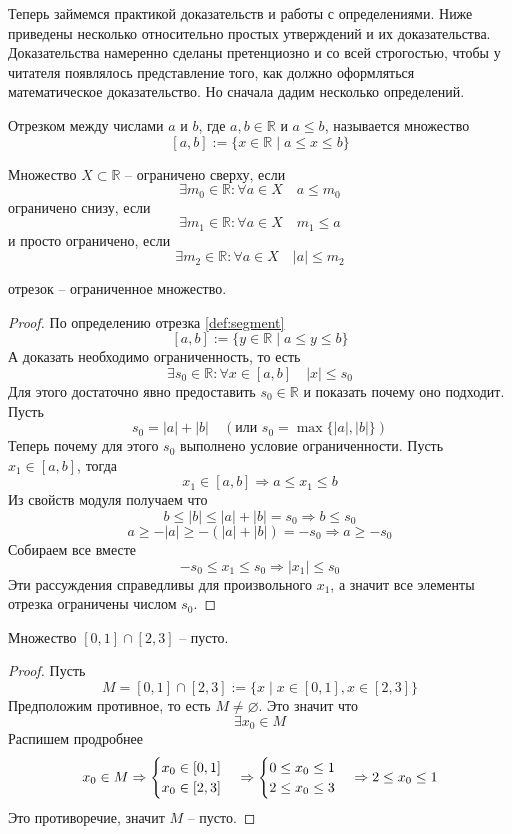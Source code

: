 Теперь займемся практикой доказательств и работы с определениями. Ниже приведены несколько относительно простых утверждений и их доказательства. Доказательства намеренно сделаны претенциозно и со всей строгостью, чтобы у читателя появлялось представление того, как должно оформляться математическое доказательство. Но сначала дадим несколько определений.
\begin{definition}\label{def:segment}
Отрезком между числами $a$ и $b$, где $a,b\in \mathbb{R}$ и $a\leq b$, называется множество
\[[a,b] := \{x\in \mathbb{R}\mid a\leq x\leq b\}\]
\end{definition}
\begin{definition}
Множество $X\subset\mathbb{R}$ -- ограничено сверху, если
\[\exists m_0\in\mathbb{R}:\forall a\in X\quad a\leq m_0\]
ограничено снизу, если
\[\exists m_1\in\mathbb{R}:\forall a\in X\quad m_1\leq a\]
и просто ограничено, если 
\[\exists m_2\in\mathbb{R}:\forall a\in X\quad |a|\leq m_2\]
\end{definition}
\begin{statement}
отрезок -- ограниченное множество.
\end{statement}
\begin{proof}
По определению отрезка \ref{def:segment}
\[[a,b] := \{y\in \mathbb{R}\mid a\leq y\leq b\}\]
А доказать необходимо ограниченность, то есть
\[\exists s_0\in\mathbb{R}:\forall x\in [a,b]\quad |x|\leq s_0\]
Для этого достаточно явно предоставить $s_0\in\mathbb{R}$ и показать почему оно подходит.\\
Пусть \[s_0 =|a|+|b|\quad(\text{или }s_0 = \max\{|a|,|b|\})\]
Теперь почему для этого $s_0$ выполнено условие ограниченности. Пусть $x_1\in[a,b]$, тогда
\[x_1\in [a,b]\Rightarrow a\leq x_1\leq b\]
Из свойств модуля получаем что
\[b\leq|b|\leq|a|+|b|=s_0\Rightarrow b\leq s_0\]
\[a\geq-|a|\geq-(|a|+|b|)=-s_0\Rightarrow a\geq -s_0\]
Собираем все вместе
\[-s_0\leq x_1\leq s_0\Rightarrow |x_1|\leq s_0\]
Эти рассуждения справедливы для произвольного $x_1$, а значит все элементы отрезка ограничены числом $s_0$.
\end{proof}
\begin{statement}
Множество $[0,1]\cap [2,3]$ -- пусто.
\end{statement}
\begin{proof}
Пусть
\[M=[0,1]\cap [2,3]:=\{x\mid x\in[0,1],x\in[2,3]\}\]
Предположим противное, то есть $M\neq\varnothing$. Это значит что
\[\exists x_0\in M\]
Распишем продробнее
\[x_0\in M\Rightarrow
\begin{cases}
x_0\in [0,1]\\
x_0\in [2,3]
\end{cases}
\Rightarrow
\begin{cases}
0\leq x_0\leq 1\\
2\leq x_0\leq 3
\end{cases}
\Rightarrow
2\leq x_0\leq 1\\
\]
Это противоречие, значит $M$ -- пусто.
\end{proof}

